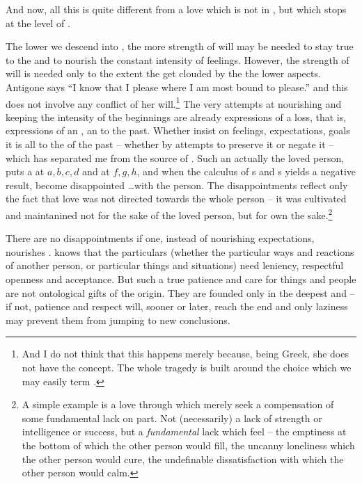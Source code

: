 \pa %
And now, all this is quite different from a love which is not 
 in , but which stops at the level of 
. 

The lower we descend into , the more strength of
will may be needed to stay true to the  and to
nourish the constant intensity of feelings.  However, the strength of
will is needed only to the extent the  get
clouded by the the lower aspects.  Antigone says ``I know that I
please where I am most bound to please.''  and this does not involve
any conflict of her will.\footnote{And I do not think that this happens
merely because, being Greek, she does not have the concept. The whole 
tragedy is built around the choice which we may easily term . 
}
The very attempts at nourishing and
keeping the intensity of the beginnings are already 
expressions of a loss, that is, expressions of an , an 
 to the past. Whether  insist on
 feelings,  expectations,  goals it is all 
 to the  of the past -- whether by 
attempts to preserve it or negate it -- 
which has separated me from the  source of . 
Such an  actually  the loved person, 
puts a \thi{+} at $a,b,c,d$ and \thi{--} at $f,g,h$, and when the 
calculus of \thi{+}s and \thi{--}s yields a negative result,  
become disappointed \ldots with the person. The disappointments 
reflect only the fact that  love was not directed towards the 
whole person -- it was cultivated and maintanined not for the sake of 
the loved person, but for  own the sake.\footnote{A simple 
example is a love through which  merely seek a compensation of 
some fundamental lack on  part. Not (necessarily) a lack of strength or 
intelligence or success, but a {\em fundamental} lack which  
feel -- the emptiness at the bottom of  which the other 
person would fill, the uncanny loneliness which the other person would 
cure, the undefinable dissatisfaction with  which the 
other person would calm.
}

\subpa
There are no disappointments if one, instead of nourishing
expectations, nourishes .   knows that the
particulars (whether the particular ways and reactions of another
person, or particular things and situations) need
leniency, respectful openness and acceptance. 
But such a true patience and care for things and people are not 
ontological gifts of the origin. They are founded
only in the deepest  and  -- if not,
patience and respect will, sooner or later, reach the end and
only laziness may prevent them from jumping to new conclusions.



